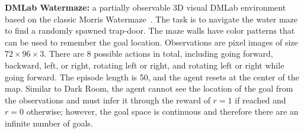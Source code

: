 \documentclass{article}
\theoremstyle{thm}
\begin{document}
{\bf DMLab Watermaze:} a partially observable 3D visual DMLab environment based on the classic Morris Watermaze~\citep{morris1981watermaze}. The task is to navigate the water maze to find a randomly spawned trap-door. The maze walls have color patterns that can be used to remember the goal location. Observations are pixel images of size $72\times96\times3$. There are 8 possible actions in total, including going forward, backward, left, or right, rotating left or right, and rotating left or right while going forward. The episode length is 50, and the agent resets at the center of the map. Similar to Dark Room, the agent cannot see the location of the goal from the observations and must infer it through the reward of $r=1$ if reached and $r=0$ otherwise; however, the goal space is continuous and therefore there are an infinite number of goals.
\end{document}
